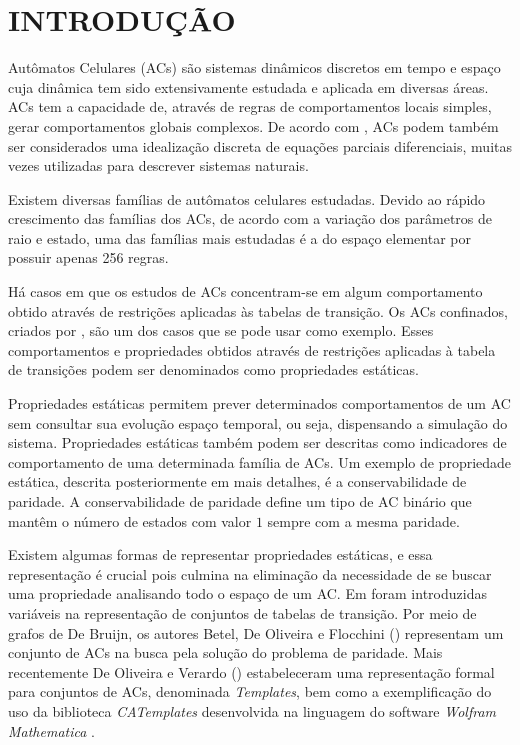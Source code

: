 \documentclass[12pt,a4paper]{article}
\let\stdsection\section
\renewcommand\section{\newpage\stdsection}
\begin{document}

\newpage
\pagestyle{plain}
\renewcommand{\baselinestretch}{1.4} 
\normalsize
\section{INTRODUÇÃO}\label{sec:introducao}
Autômatos Celulares (ACs) são sistemas dinâmicos discretos em tempo e espaço cuja dinâmica tem sido extensivamente estudada e aplicada em diversas áreas. ACs tem a capacidade de, através de regras de comportamentos locais simples, gerar comportamentos globais complexos. De acordo com , ACs podem também ser considerados uma idealização discreta de equações parciais diferenciais, muitas vezes utilizadas para descrever sistemas naturais.

Existem diversas famílias de autômatos celulares estudadas. Devido ao rápido crescimento das famílias dos ACs, de acordo com a variação dos parâmetros de raio e estado, uma das famílias mais estudadas é a do espaço elementar por possuir apenas 256 regras.

Há casos em que os estudos de ACs concentram-se em algum comportamento obtido através de restrições aplicadas às tabelas de transição. Os ACs confinados, criados por , são um dos casos que se pode usar como exemplo. Esses comportamentos e propriedades obtidos através de restrições aplicadas à tabela de transições podem ser denominados como propriedades estáticas.

Propriedades estáticas permitem prever determinados comportamentos de um AC sem consultar sua evolução espaço temporal, ou seja, dispensando a simulação do sistema. Propriedades estáticas também podem ser descritas como indicadores de comportamento de uma determinada família de ACs. Um exemplo de propriedade estática, descrita posteriormente em mais detalhes, é a conservabilidade de paridade. A conservabilidade de paridade define um tipo de AC binário que mantêm o número de estados com valor $1$ sempre com a mesma paridade.

Existem algumas formas de representar propriedades estáticas, e essa representação é crucial pois culmina na eliminação da necessidade de se buscar uma propriedade analisando todo o espaço de um AC. Em  foram introduzidas variáveis na representação de conjuntos de tabelas de transição. Por meio de grafos de De Bruijn, os autores Betel, De Oliveira e Flocchini (\citeyear{Betel2013}) representam um conjunto de ACs na busca pela solução do problema de paridade. Mais recentemente De Oliveira e Verardo (\citeyear{deOliveira2014}) estabeleceram uma representação formal para conjuntos de ACs, denominada \textit{Templates}, bem como a exemplificação do uso da biblioteca \textit{CATemplates} \cite{CATemplates} desenvolvida na linguagem do software \textit{Wolfram Mathematica} \cite{woframMathematica10}.
\end{document}
